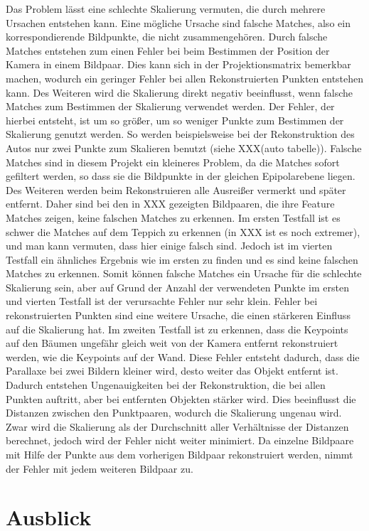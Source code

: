 Das Problem lässt eine schlechte Skalierung vermuten, die durch mehrere Ursachen entstehen kann. 
Eine mögliche Ursache sind falsche Matches, also ein korrespondierende Bildpunkte, die nicht zusammengehören.
Durch falsche Matches entstehen zum einen Fehler bei beim Bestimmen der Position der Kamera in einem Bildpaar.
Dies kann sich in der Projektionsmatrix bemerkbar machen, wodurch ein geringer Fehler bei allen Rekonstruierten Punkten entstehen kann.
Des Weiteren wird die Skalierung direkt negativ beeinflusst, wenn falsche Matches zum Bestimmen der Skalierung verwendet werden. 
Der Fehler, der hierbei entsteht, ist um so größer, um so weniger Punkte zum Bestimmen der Skalierung genutzt werden.
So werden beispielsweise bei der Rekonstruktion des Autos nur zwei Punkte zum Skalieren benutzt (siehe XXX(auto tabelle)).
Falsche Matches sind in diesem Projekt ein kleineres Problem, da die Matches sofort gefiltert werden, so dass sie die Bildpunkte in der gleichen Epipolarebene liegen.
Des Weiteren werden beim Rekonstruieren alle Ausreißer vermerkt und später entfernt.
Daher sind bei den in XXX gezeigten Bildpaaren, die ihre Feature Matches zeigen, keine falschen Matches zu erkennen.
Im ersten Testfall ist es schwer die Matches auf dem Teppich zu erkennen (in XXX ist es noch extremer), und man kann vermuten, dass hier einige falsch sind.
Jedoch ist im vierten Testfall ein ähnliches Ergebnis wie im ersten zu finden und es sind keine falschen Matches zu erkennen.
Somit können falsche Matches ein Ursache für die schlechte Skalierung sein, aber auf Grund der Anzahl der verwendeten Punkte im ersten und vierten Testfall ist der verursachte Fehler nur sehr klein.
Fehler bei rekonstruierten Punkten sind eine weitere Ursache, die einen stärkeren Einfluss auf die Skalierung hat. 
Im zweiten Testfall ist zu erkennen, dass die Keypoints auf den Bäumen ungefähr gleich weit von der Kamera entfernt rekonstruiert werden, wie die Keypoints auf der Wand.
Diese Fehler entsteht dadurch, dass die Parallaxe bei zwei Bildern kleiner wird, desto weiter das Objekt entfernt ist. %
Dadurch entstehen Ungenauigkeiten bei der Rekonstruktion, die bei allen Punkten auftritt, aber bei entfernten Objekten stärker wird. %
Dies beeinflusst die Distanzen zwischen den Punktpaaren, wodurch die Skalierung ungenau wird.
Zwar wird die Skalierung als der Durchschnitt aller Verhältnisse der Distanzen berechnet, jedoch wird der Fehler nicht weiter minimiert.
Da einzelne Bildpaare mit Hilfe der Punkte aus dem vorherigen Bildpaar rekonstruiert werden, nimmt der Fehler mit jedem weiteren Bildpaar zu. 

\chapter{Ausblick}

